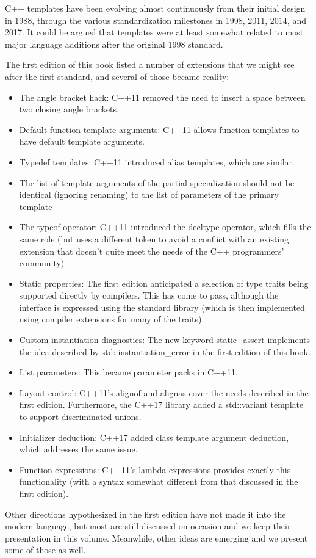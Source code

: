 
C++ templates have been evolving almost continuously from their initial design in 1988, through the various standardization milestones in 1998, 2011, 2014, and 2017. It could be argued that templates were at least somewhat related to most major language additions after the original 1998 standard.

The first edition of this book listed a number of extensions that we might see after the first standard, and several of those became reality:


\begin{itemize}
\item 
The angle bracket hack: C++11 removed the need to insert a space between two closing angle brackets.

\item 
Default function template arguments: C++11 allows function templates to have default template arguments.

\item 
Typedef templates: C++11 introduced alias templates, which are similar.

\item 
The list of template arguments of the partial specialization should not be identical (ignoring renaming) to the list of parameters of the primary template

\item 
The typeof operator: C++11 introduced the decltype operator, which fills the same role (but uses a different token to avoid a conflict with an existing extension that doesn’t quite meet the needs of the C++ programmers’ community)

\item 
Static properties: The first edition anticipated a selection of type traits being supported directly by compilers. This has come to pass, although the interface is expressed using the standard library (which is then implemented using compiler extensions for many of the traits).

\item 
Custom instantiation diagnostics: The new keyword static\_assert implements the idea described by std::instantiation\_error in the first edition of this book.

\item 
List parameters: This became parameter packs in C++11.

\item 
Layout control: C++11’s alignof and alignas cover the needs described in the first edition. Furthermore, the C++17 library added a std::variant template to support discriminated unions.

\item 
Initializer deduction: C++17 added class template argument deduction, which addresses the same issue.

\item 
Function expressions: C++11’s lambda expressions provides exactly this functionality (with a syntax somewhat different from that discussed in the first edition).
\end{itemize}

Other directions hypothesized in the first edition have not made it into the modern language, but most are still discussed on occasion and we keep their presentation in this volume. Meanwhile, other ideas are emerging and we present some of those as well.



